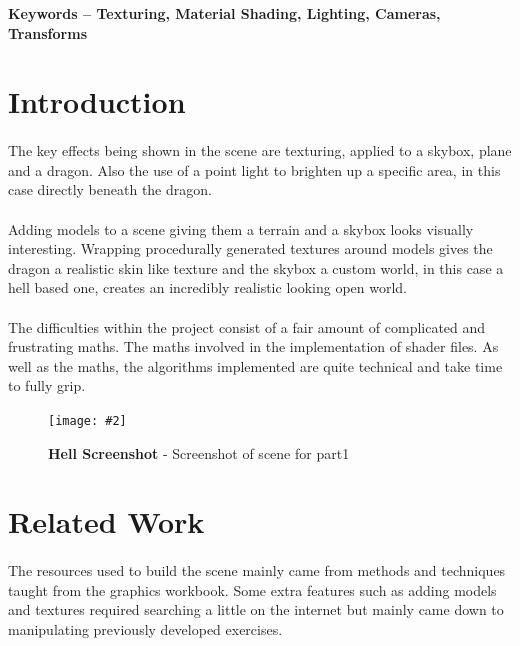 \documentclass[10pt, a4paper]{article}
\title{\mytitle}
\author{\myauthor\hspace{1em}\\\contact\\Edinburgh Napier University\hspace{0.5em}-\hspace{0.5em}\mymodule}
\date{}
\newcommand{\figuremacro}[5]{
    \begin{figure}[#1]
        \centering
        \texttt{[image: \#2]}
        \caption[#3]{\textbf{#3}#4}
        \label{fig:#2}
    \end{figure}
}
\begin{document}
	\maketitle
	\begin{abstract}
		This report will show the implementation of a graphics coursework. The coursework involves creating a 3D scene using OpenGL and showing the understanding of computer graphics principles. 
		
	\end{abstract}
    
	\textbf{Keywords -- Texturing, Material Shading, Lighting, Cameras, Transforms  }{}
	\section{Introduction}
    \paragraph{}
    The key effects being shown in the scene are texturing, applied to a skybox, plane and a dragon. Also the use of a point light to brighten up a specific area, in this case directly beneath the dragon.
    \paragraph{}
    Adding models to a scene giving them a terrain and a skybox looks visually interesting. Wrapping procedurally generated textures around models gives the dragon a realistic skin like texture and the skybox a custom world, in this case a hell based one, creates an incredibly realistic looking open world.
    
    \paragraph{}
    The difficulties within the project consist of a fair amount of complicated and frustrating maths. The maths involved in the implementation of shader files. As well as the maths, the algorithms implemented are quite technical and take time to fully grip.
    
    \figuremacro{h}{scene}{Hell Screenshot}{ - Screenshot of scene for part1}{1.0}
	
	\section{Related Work}
	\paragraph{}
	The resources used to build the scene mainly came from methods and techniques taught from the graphics workbook. Some extra features such as adding models and textures required searching a little on the internet but mainly came down to manipulating previously developed exercises.
	
\end{document}

